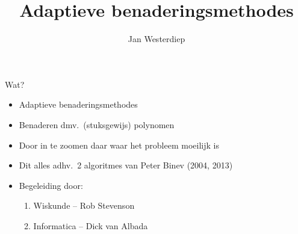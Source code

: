 \documentclass{beamer}
\title{Adaptieve benaderingsmethodes}
\author{Jan Westerdiep}
\begin{document}
\begin{frame}
\titlepage
\end{frame}

\begin{frame}{Wat?}
\begin{itemize}
  \item \alert<3>{Adaptieve} \alert<2>{benaderingsmethodes} \pause
  \item Benaderen dmv.~(stuksgewijs) polynomen \pause
  \item Door in te zoomen daar waar het probleem moeilijk is \pause
  \item Dit alles adhv.~2 algoritmes van Peter Binev (2004, 2013) \pause
  \item Begeleiding door:
    \begin{enumerate}
      \item Wiskunde -- Rob Stevenson
      \item Informatica -- Dick van Albada
    \end{enumerate}
\end{itemize}
\end{frame}
\end{document}

